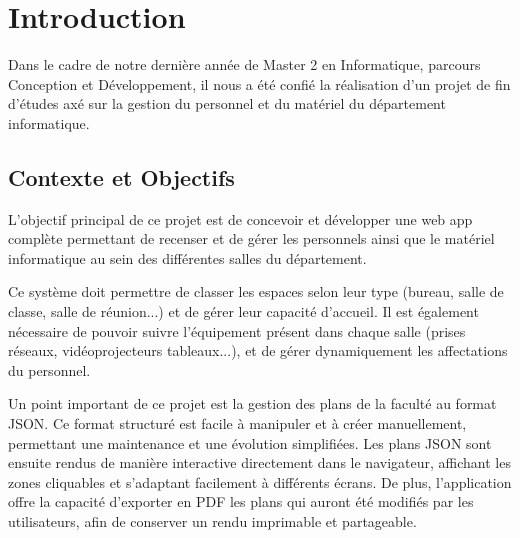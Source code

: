 \chapter{Introduction}

Dans le cadre de notre dernière année de Master 2 en Informatique, parcours Conception et Développement, il nous a été confié la réalisation d'un projet de fin d'études axé sur la gestion du personnel et du matériel du département informatique. 

\section{Contexte et Objectifs}
L'objectif principal de ce projet est de concevoir et développer une web app complète permettant de recenser et de gérer les personnels ainsi que le matériel informatique au sein des différentes salles du département. 

Ce système doit permettre de classer les espaces selon leur type (bureau, salle de classe, salle de réunion...) et de gérer leur capacité d'accueil. Il est également nécessaire de pouvoir suivre l'équipement présent dans chaque salle (prises réseaux, vidéoprojecteurs tableaux...), et de gérer dynamiquement les affectations du personnel.

Un point important de ce projet est la gestion des plans de la faculté au format JSON. Ce format structuré est facile à manipuler et à créer manuellement, permettant une maintenance et une évolution simplifiées. Les plans JSON sont ensuite rendus de manière interactive directement dans le navigateur, affichant les zones cliquables et s'adaptant facilement à différents écrans. De plus, l'application offre la capacité d'exporter en PDF les plans qui auront été modifiés par les utilisateurs, afin de conserver un rendu imprimable et partageable.

\newpage

